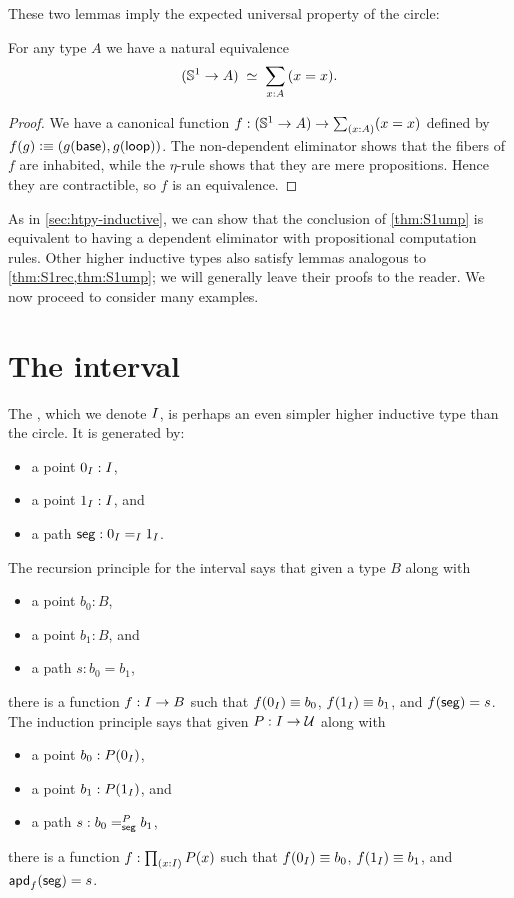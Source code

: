 These two lemmas imply the expected universal property of the circle:

\begin{lem}\label{thm:S1ump}
  For any type $A$ we have a natural equivalence
  \[ (\Sn^1 \to A) \;\eqvsym\;
  \sm{x:A} (x=x).
  \]
\end{lem}
\begin{proof}
  We have a canonical function $f:(\Sn^1 \to A) \to \sm{x:A} (x=x)$ defined by $f(g) \defeq (g(\base),\ap g \lloop)$.
  The non-dependent eliminator shows that the fibers of $f$ are inhabited, while the $\eta$-rule shows that they are mere propositions.
  Hence they are contractible, so $f$ is an equivalence.
\end{proof}

%

As in \autoref{sec:htpy-inductive}, we can show that the conclusion of \autoref{thm:S1ump} is equivalent to having a dependent eliminator with propositional computation rules.
Other higher inductive types also satisfy lemmas analogous to \autoref{thm:S1rec,thm:S1ump}; we will generally leave their proofs to the reader.
We now proceed to consider many examples.


\section{The interval}
\label{sec:interval}

%
%
The , which we denote $\interval$, is perhaps an even simpler higher inductive type than the circle.
It is generated by:
\begin{itemize}
\item a point $\izero:\interval$,
\item a point $\ione:\interval$, and
\item a path $\seg : \id[\interval]\izero\ione$.
\end{itemize}
%
The recursion principle for the interval says that given a type $B$ along with
\begin{itemize}
\item a point $b_0:B$,
\item a point $b_1:B$, and
\item a path $s:b_0=b_1$,
\end{itemize}
there is a function $f:\interval\to B$ such that $f(\izero)\jdeq b_0$, $f(\ione)\jdeq b_1$, and $\ap f \seg = s$.
%
The induction principle says that given $P:\interval\to\type$ along with
\begin{itemize}
\item a point $b_0:P(\izero)$,
\item a point $b_1:P(\ione)$, and
\item a path $s:\dpath{P}{\seg}{b_0}{b_1}$,
\end{itemize}
there is a function $f:\prd{x:\interval} P(x)$ such that $f(\izero)\jdeq b_0$, $f(\ione)\jdeq b_1$, and $\apd f \seg = s$.


